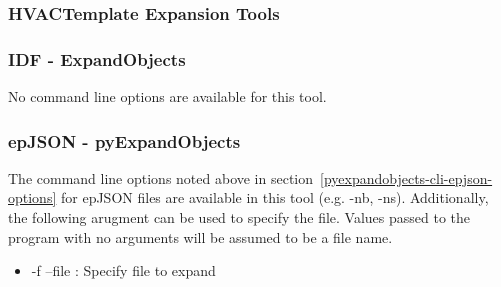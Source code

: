 \subsubsection{HVACTemplate Expansion Tools}

\subsubsection*{IDF - ExpandObjects}

No command line options are available for this tool.

\subsubsection*{epJSON - pyExpandObjects}

The command line options noted above in section~\ref{pyexpandobjects-cli-epjson-options} for epJSON files are available in this tool (e.g. -nb, -ns).  Additionally, the following arugment can be used to specify the file.  Values passed to the program with no arguments will be assumed to be a file name.

\begin{itemize}

\item
  -f --file : Specify file to expand
  
\end{itemize}
